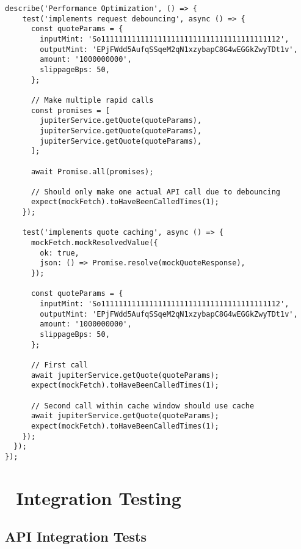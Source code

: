 \documentclass[11pt,a4paper]{article}
\begin{document}
\begin{lstlisting}[style=typescript, caption=Service Layer Unit Tests]
  describe('Performance Optimization', () => {
    test('implements request debouncing', async () => {
      const quoteParams = {
        inputMint: 'So11111111111111111111111111111111111111112',
        outputMint: 'EPjFWdd5AufqSSqeM2qN1xzybapC8G4wEGGkZwyTDt1v',
        amount: '1000000000',
        slippageBps: 50,
      };

      // Make multiple rapid calls
      const promises = [
        jupiterService.getQuote(quoteParams),
        jupiterService.getQuote(quoteParams),
        jupiterService.getQuote(quoteParams),
      ];

      await Promise.all(promises);

      // Should only make one actual API call due to debouncing
      expect(mockFetch).toHaveBeenCalledTimes(1);
    });

    test('implements quote caching', async () => {
      mockFetch.mockResolvedValue({
        ok: true,
        json: () => Promise.resolve(mockQuoteResponse),
      });

      const quoteParams = {
        inputMint: 'So11111111111111111111111111111111111111112',
        outputMint: 'EPjFWdd5AufqSSqeM2qN1xzybapC8G4wEGGkZwyTDt1v',
        amount: '1000000000',
        slippageBps: 50,
      };

      // First call
      await jupiterService.getQuote(quoteParams);
      expect(mockFetch).toHaveBeenCalledTimes(1);

      // Second call within cache window should use cache
      await jupiterService.getQuote(quoteParams);
      expect(mockFetch).toHaveBeenCalledTimes(1);
    });
  });
});
\end{lstlisting}

\section{🔗 Integration Testing}

\subsection{API Integration Tests}
\end{document}
